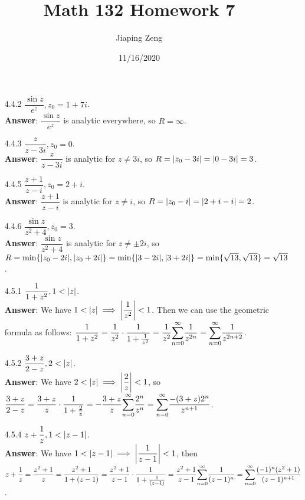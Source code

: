 \documentclass{article}
\title{Math 132 Homework 7}
\date{11/16/2020}
\author{Jiaping Zeng}
\begin{document}
\maketitle

\begin{itemize}
      \item [4.4.2] $\dfrac{\sin z}{e^z},z_0=1+7i$.\\
            \textbf{Answer}: $\dfrac{\sin z}{e^z}$ is analytic everywhere, so $R=\infty$.
      \item [4.4.3] $\dfrac{z}{z-3i},z_0=0$.\\
            \textbf{Answer}: $\dfrac{z}{z-3i}$ is analytic for $z\neq 3i$, so $R=\abs{z_0-3i}=\abs{0-3i}=3$.
      \item [4.4.5] $\dfrac{z+1}{z-i},z_0=2+i$.\\
            \textbf{Answer}: $\dfrac{z+1}{z-i}$ is analytic for $z\neq i$, so $R=\abs{z_0-i}=\abs{2+i-i}=2$.
      \item [4.4.6] $\dfrac{\sin z}{z^2+4},z_0=3$.\\
            \textbf{Answer}: $\dfrac{\sin z}{z^2+4}$ is analytic for $z\neq\pm 2i$, so $R=\min\{\abs{z_0-2i},\abs{z_0+2i}\}=\min\{\abs{3-2i},\abs{3+2i}\}=\min\{\sqrt{13},\sqrt{13}\}=\sqrt{13}$.
      \item [4.5.1] $\dfrac{1}{1+z^2},1<\abs{z}$.\\
            \textbf{Answer}: We have $1<\abs{z}\implies\abs{\dfrac{1}{z^2}}<1$. Then we can use the geometric formula as follows: $\dfrac{1}{1+z^2}=\dfrac{1}{z^2}\cdot\dfrac{1}{1+\frac{1}{z^2}}=\dfrac{1}{z^2}\mathlarger{\sum_{n=0}^\infty}\dfrac{1}{z^{2n}}=\mathlarger{\sum_{n=0}^\infty}\dfrac{1}{z^{2n+2}}$.
      \item [4.5.2] $\dfrac{3+z}{2-z},2<\abs{z}$.\\
            \textbf{Answer}: We have $2<\abs{z}\implies\abs{\dfrac{2}{z}}<1$, so $\dfrac{3+z}{2-z}=\dfrac{3+z}{z}\cdot\dfrac{1}{1+\frac{2}{z}}=-\dfrac{3+z}{z}\mathlarger{\sum_{n=0}^\infty}\dfrac{2^n}{z^n}=\mathlarger{\sum_{n=0}^\infty}\dfrac{-(3+z)2^n}{z^{n+1}}$.
      \item [4.5.4] $z+\dfrac{1}{z},1<\abs{z-1}$.\\
            \textbf{Answer}: We have $1<\abs{z-1}\implies\abs{\dfrac{1}{z-1}}<1$, then $z+\dfrac{1}{z}=\dfrac{z^2+1}{z}=\dfrac{z^2+1}{1+(z-1)}=\dfrac{z^2+1}{z-1}\cdot\dfrac{1}{1+\frac{1}{(z-1)}}=\dfrac{z^2+1}{z-1}\mathlarger{\sum_{n=0}^\infty}\dfrac{1}{(z-1)^n}=\mathlarger{\sum_{n=0}^\infty}\dfrac{(-1)^n(z^2+1)}{(z-1)^{n+1}}$.

\end{itemize}
\end{document}
